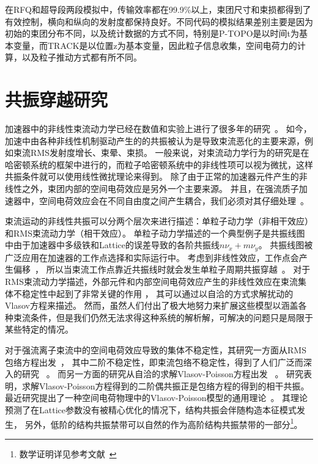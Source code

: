 在RFQ和超导段两段模拟中，传输效率都在99.9\%以上，束团尺寸和束损都得到了有效控制，横向和纵向的发射度都保持良好。不同代码的模拟结果差别主要是因为初始的束团分布不同，以及统计数据的方式不同，特别是P-TOPO是以时间t为基本变量，而TRACK是以位置z为基本变量，因此粒子信息收集，空间电荷力的计算，以及粒子推动方式都有所不同。

\section{共振穿越研究}

加速器中的非线性束流动力学已经在数值和实验上进行了很多年的研究~\cite{accelerator2004lee,reiser2008theory}。
如今，加速中由各种非线性机制驱动产生的的共振被认为是导致束流恶化的主要来源，例如束流RMS发射度增长、束晕、束损。
一般来说，对束流动力学行为的研究是在哈密顿系统的框架中进行的，而粒子哈密顿系统中的非线性项可以视为微扰，这样共振条件就可以使用线性微扰理论来得到。
除了由于正常的加速器元件产生的非线性之外，束团内部的空间电荷效应是另外一个主要来源。
并且，在强流质子加速器中，空间电荷效应会在不同自由度之间产生耦合，我们必须对其仔细处理~\cite{accelerator2013chao}。

束流运动的非线性共振可以分两个层次来进行描述：单粒子动力学（非相干效应）和RMS束流动力学（相干效应）。
单粒子动力学描述的一个典型例子是共振线图中由于加速器中多级铁和Lattice的误差导致的各阶共振线$n\nu_x+m\nu_y$。
共振线图被广泛应用在加速器的工作点选择和实际运行中。
考虑到非线性效应，工作点会产生偏移~\cite{fedotov2001space}，
所以当束流工作点靠近共振线时就会发生单粒子周期共振穿越~\cite{franchetti2006particle}。
对于RMS束流动力学描述，外部元件和内部空间电荷效应产生的非线性效应在束流集体不稳定性中起到了非常关键的作用
\cite{sacherer1968transverse, sacherer1973longitudinal}，
其可以通过以自洽的方式求解扰动的Vlasov方程来描述\cite{chao1993physics,gluckstern1970oscillation,gluckstern1970stability}。
然而，虽然人们付出了极大地努力来扩展这些模型以涵盖各种束流条件，但是我们仍然无法求得这种系统的解析解，可解决的问题只是局限于某些特定的情况。

对于强流离子束流中的空间电荷效应导致的集体不稳定性，其研究一方面从RMS包络方程出发~\cite{sacherer1971rms}，
其中二阶不稳定性，即束流包络不稳定性，得到了人们广泛而深入的研究 ~\cite{14,15,16,17,21,22}。
而另一方面的研究从自洽的求解Vlasov-Poisson方程出发 ~\cite{11,12,18,19}。
研究表明，求解Vlasov-Poisson方程得到的二阶偶共振正是包络方程的得到的相干共振。
最近研究提出了一种空间电荷物理中的Vlasov-Poisson模型的通用理论~\cite{11, 12}。
其理论预测了在Lattice参数没有被精心优化的情况下，结构共振会伴随构造本征模式发生，
另外，低阶的结构共振禁带可以自然的作为高阶结构共振禁带的一部分\footnote{数学证明详见参考文献~\cite{12}}。

